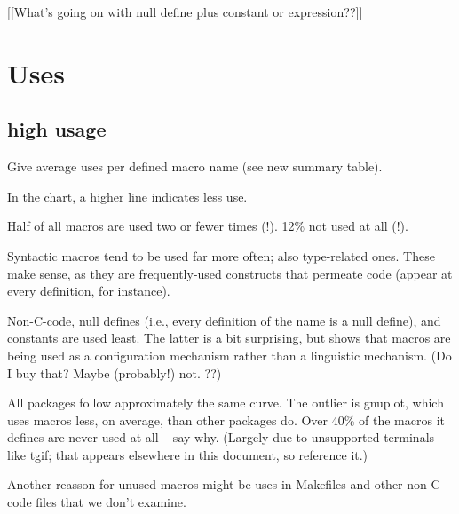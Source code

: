 \documentclass[10pt]{article}
\newcommand{\pkg}[1]{\textsf{#1}}
\begin{document}
        [[What's going on with null define plus constant or expression??]]

\section{Uses}

\subsection{high usage}

        Give average uses per defined macro name (see new summary table).

        In the chart, a higher line indicates less use.

        Half of all macros are used two or fewer times (!).  12\% not used
          at all (!).

        Syntactic macros tend to be used far more often; also type-related
          ones.  These make sense, as they are frequently-used constructs
          that permeate code (appear at every definition, for instance).

        Non-C-code, null defines (i.e., every definition of the name is a
          null define), and constants are used least.  The latter is a bit
          surprising, but shows that macros are being used as a
          configuration mechanism rather than a linguistic mechanism.  (Do
          I buy that?  Maybe (probably!) not. ??)

        All packages follow approximately the same curve.  The outlier is
          \pkg{gnuplot}, which uses macros less, on average, than other packages
          do.  Over 40\% of the macros it defines are never used at all --
          say why.  (Largely due to unsupported terminals like tgif; that
          appears elsewhere in this document, so reference it.)

          Another reasson for unused macros might be uses in Makefiles and
          other non-C-code files that we don't examine.


\end{document}
